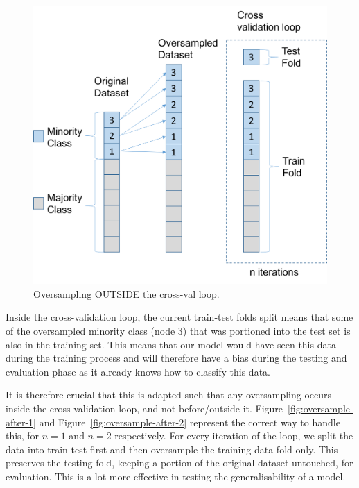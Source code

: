 \documentclass[12pt,a4paper,twoside]{report}
\begin{document}
\begin{figure}[H]
\centering
\includegraphics[scale=0.8]{oversample-before}
\caption{Oversampling OUTSIDE the cross-val loop.}
\label{fig:oversample-before}
\end{figure}

Inside the cross-validation loop, the current train-test folds split means that some of the oversampled minority class (node 3) that was portioned into the test set is also in the training set. This means that our model would have seen this data during the training process and will therefore have a bias during the testing and evaluation phase as it already knows how to classify this data. 

It is therefore crucial that this is adapted such that any oversampling occurs inside the cross-validation loop, and not before/outside it. Figure~\ref{fig:oversample-after-1} and Figure~\ref{fig:oversample-after-2} represent the correct way to handle this, for $n=1$ and $n=2$ respectively. For every iteration of the loop, we split the data into train-test first and then oversample the training data fold only. This preserves the testing fold, keeping a portion of the original dataset untouched, for evaluation. This is a lot more effective in testing the generalisability of a model.
\end{document}
